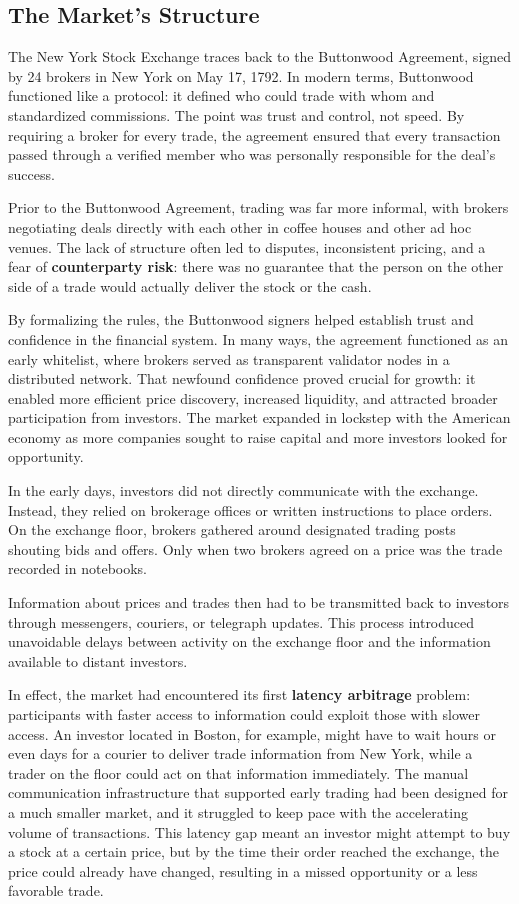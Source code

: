 \subsection{The Market's Structure}
The New York Stock Exchange traces back to the Buttonwood Agreement, signed by 24 brokers in New York on May 17, 1792.
In modern terms, Buttonwood functioned like a protocol: it defined who could trade with whom and standardized commissions. 
The point was trust and control, not speed. By requiring a broker for every trade, the agreement ensured that every transaction passed through a verified member who was personally responsible for the deal's success.

Prior to the Buttonwood Agreement, trading was far more informal, with brokers negotiating deals directly with each other in coffee houses and other ad hoc venues.
The lack of structure often led to disputes, inconsistent pricing, and a fear of \textbf{counterparty risk}: there was no guarantee that the person on the other side of a trade would actually deliver the stock or the cash.

By formalizing the rules, the Buttonwood signers helped establish trust and confidence in the financial system. In many ways, the agreement functioned as an early whitelist, where brokers served as transparent validator nodes in a distributed network.
That newfound confidence proved crucial for growth: it enabled more efficient price discovery, increased liquidity, and attracted broader participation from investors.
The market expanded in lockstep with the American economy as more companies sought to raise capital and more investors looked for opportunity.

In the early days, investors did not directly communicate with the exchange. Instead, they relied on brokerage offices or written instructions to place orders.
On the exchange floor, brokers gathered around designated trading posts shouting bids and offers. Only when two brokers agreed on a price was the trade recorded in notebooks.

Information about prices and trades then had to be transmitted back to investors through messengers, couriers, or telegraph updates. This process introduced unavoidable delays between activity on the exchange floor and the information available to distant investors.

In effect, the market had encountered its first \textbf{latency arbitrage} problem: participants with faster access to information could exploit those with slower access.
An investor located in Boston, for example, might have to wait hours or even days for a courier to deliver trade information from New York, while a trader on the floor could act on that information immediately.
The manual communication infrastructure that supported early trading had been designed for a much smaller market, and it struggled to keep pace with the accelerating volume of transactions.
This latency gap meant an investor might attempt to buy a stock at a certain price, but by the time their order reached the exchange, the price could already have changed, resulting in a missed opportunity or a less favorable trade.

